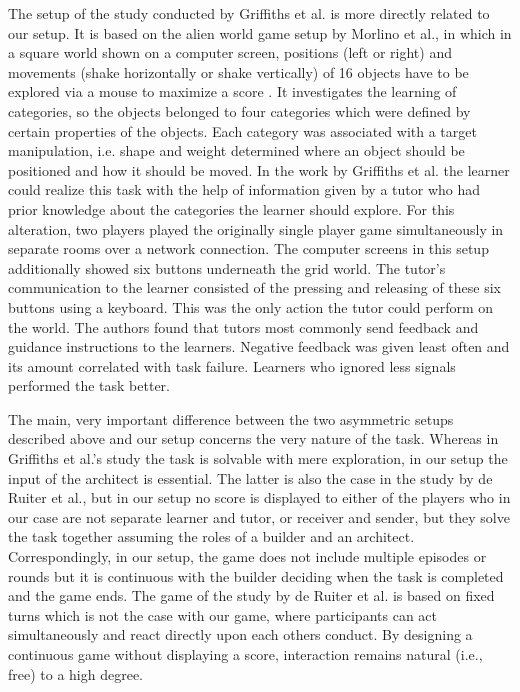 The setup of the study conducted by Griffiths et al. \cite{griffiths2012bottom} is more directly related to our setup. It is based on the alien world game setup by Morlino et al., in which in a square world shown on a computer screen, positions (left or right) and movements (shake horizontally or shake vertically) of 16 objects have to be explored via a mouse to maximize a score \cite{morlino2010developing}. It investigates the learning of categories, so the objects belonged to four categories which were defined by certain properties of the objects. Each category was associated with a target manipulation, i.e. shape and weight determined where an object should be positioned and how it should be moved. In the work by Griffiths et al. the learner could realize this task with the help of information given by a tutor who had prior knowledge about the categories the learner should explore. For this alteration, two players played the originally single player game simultaneously in separate rooms over a network connection. The computer screens in this setup additionally showed six buttons underneath the grid world. The tutor's communication to the learner consisted of the pressing and releasing of these six buttons using a keyboard. This was the only action the tutor could perform on the world. The authors found that tutors most commonly send feedback and guidance instructions to the learners. Negative feedback was given least often and its amount correlated with task failure. Learners who ignored less signals performed the task better.

The main, very important difference between the two asymmetric setups described above and our setup concerns the very nature of the task. Whereas in Griffiths et al.'s study the task is solvable with mere exploration, in our setup the input of the architect is essential. The latter is also the case in the study by de Ruiter et al., but in our setup no score is displayed to either of the players who in our case are not separate learner and tutor, or receiver and sender, but they solve the task together assuming the roles of a builder and an architect. Correspondingly, in our setup, the game does not include multiple episodes or rounds but it is continuous with the builder deciding when the task is completed and the game ends. The game of the study by de Ruiter et al. is based on fixed turns which is not the case with our game, where participants can act simultaneously and react directly upon each others conduct. By designing a continuous game without displaying a score, interaction remains natural (i.e., free) to a high degree. 

